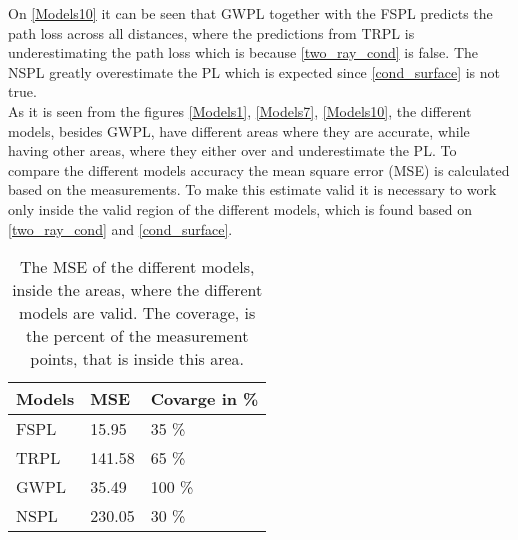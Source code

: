 On \autoref{Models10} it can be seen that GWPL together with the FSPL predicts the path loss across all distances, where the predictions from TRPL is underestimating the path loss which is because \autoref{two_ray_cond} is false. The NSPL greatly overestimate the PL which is expected since \autoref{cond_surface} is not true.\\



As it is seen from the figures \autoref{Models1}, \autoref{Models7}, \autoref{Models10}, the different models, besides GWPL, have different areas where they are accurate, while having other areas, where they either over and underestimate the PL. To compare the different models accuracy the mean square error (MSE) is calculated based on the measurements. To make this estimate valid it is necessary to work only inside the valid region of the different models, which is found based on \eqref{two_ray_cond} and \eqref{cond_surface}. 




\begin{table}[!htbp]
\centering
\begin{tabular}{|l|l|l|}
\hline
\textbf{Models} & \textbf{MSE} & \textbf{Covarge in \%} \\ \hline
FSPL            & 15.95        & 35 \%                  \\ \hline
TRPL 		    & 141.58       & 65 \%                  \\ \hline %
GWPL            & 35.49        & 100 \%                 \\ \hline
NSPL            & 230.05       & 30 \%                  \\ \hline
\end{tabular}
\caption{The MSE of the different models, inside the areas, where the different models are valid. The coverage, is the percent of the measurement points, that is inside this area.}
\label{model_comparison}
\end{table}





